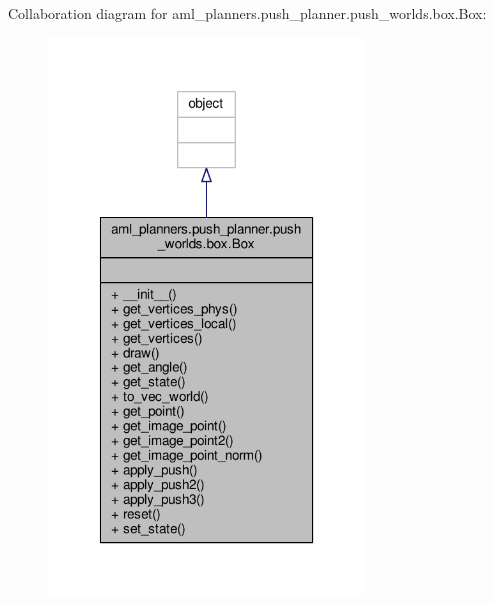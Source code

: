 Collaboration diagram for aml\-\_\-planners.\-push\-\_\-planner.\-push\-\_\-worlds.\-box.\-Box\-:\nopagebreak
\begin{figure}[H]
\begin{center}
\leavevmode
\includegraphics[width=238pt]{classaml__planners_1_1push__planner_1_1push__worlds_1_1box_1_1_box__coll__graph}
\end{center}
\end{figure}
